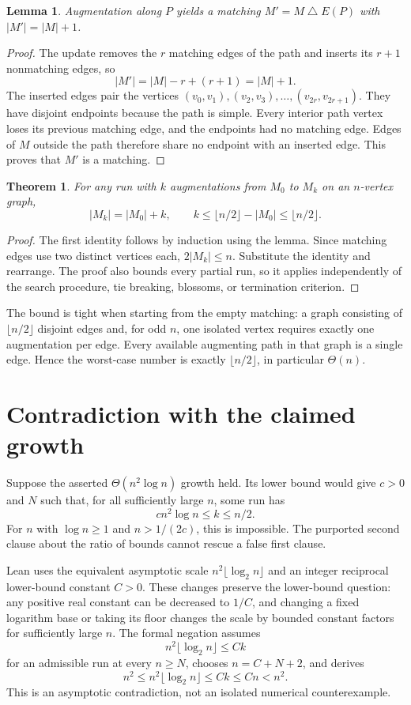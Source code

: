 \documentclass[11pt]{article}
\newtheorem{theorem}{Theorem}
\newtheorem{lemma}{Lemma}
\begin{document}
\begin{lemma}
Augmentation along $P$ yields a matching $M'=M\mathbin{\triangle}E(P)$ with $|M'|=|M|+1$.
\end{lemma}
\begin{proof}
The update removes the $r$ matching edges of the path and inserts its $r+1$ nonmatching edges, so
\[
|M'|=|M|-r+(r+1)=|M|+1.
\]
The inserted edges pair the vertices $(v_0,v_1),(v_2,v_3),\ldots,(v_{2r},v_{2r+1})$. They have disjoint endpoints because the path is simple. Every interior path vertex loses its previous matching edge, and the endpoints had no matching edge. Edges of $M$ outside the path therefore share no endpoint with an inserted edge. This proves that $M'$ is a matching.
\end{proof}

\begin{theorem}
For any run with $k$ augmentations from $M_0$ to $M_k$ on an $n$-vertex graph,
\[
|M_k|=|M_0|+k,\qquad
k\le\lfloor n/2\rfloor-|M_0|\le\lfloor n/2\rfloor.
\]
\end{theorem}
\begin{proof}
The first identity follows by induction using the lemma. Since matching edges use two distinct vertices each, $2|M_k|\le n$. Substitute the identity and rearrange. The proof also bounds every partial run, so it applies independently of the search procedure, tie breaking, blossoms, or termination criterion.
\end{proof}
The bound is tight when starting from the empty matching: a graph consisting of $\lfloor n/2\rfloor$ disjoint edges and, for odd $n$, one isolated vertex requires exactly one augmentation per edge. Every available augmenting path in that graph is a single edge. Hence the worst-case number is exactly $\lfloor n/2\rfloor$, in particular $\Theta(n)$.

\section{Contradiction with the claimed growth}
Suppose the asserted $\Theta(n^2\log n)$ growth held. Its lower bound would give $c>0$ and $N$ such that, for all sufficiently large $n$, some run has
\[
c n^2\log n\le k\le n/2.
\]
For $n$ with $\log n\ge1$ and $n>1/(2c)$, this is impossible. The purported second clause about the ratio of bounds cannot rescue a false first clause.

Lean uses the equivalent asymptotic scale $n^2\lfloor\log_2 n\rfloor$ and an integer reciprocal lower-bound constant $C>0$. These changes preserve the lower-bound question: any positive real constant can be decreased to $1/C$, and changing a fixed logarithm base or taking its floor changes the scale by bounded constant factors for sufficiently large $n$. The formal negation assumes
\[
 n^2\lfloor\log_2 n\rfloor\le Ck
\]
for an admissible run at every $n\ge N$, chooses $n=C+N+2$, and derives
\[
 n^2\le n^2\lfloor\log_2 n\rfloor\le Ck\le Cn<n^2.
\]
This is an asymptotic contradiction, not an isolated numerical counterexample.
\end{document}
